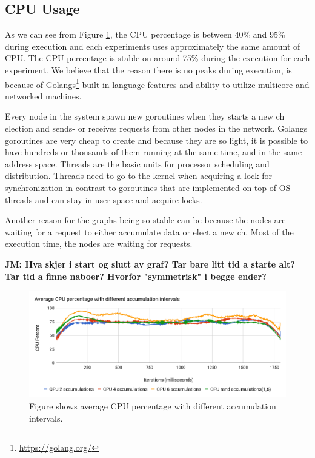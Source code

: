 \documentclass[USenglish]{uit-thesis}
\begin{document}
\subsection{CPU Usage}
As we can see from Figure \ref{fig:cpuChart}, the CPU percentage is between 40\% and 95\% during execution and each experiments uses approximately the same amount of CPU.
The CPU percentage is stable on around 75\% during the execution for each experiment. We believe that the reason there is no peaks during execution, is because of Golangs\footnote{\url{https://golang.org/}} built-in language features and ability to utilize multicore and networked machines.

Every node in the system spawn new goroutines when they starts a new \gls{ch} election and sends- or receives requests from other nodes in the network.
Golangs goroutines are very cheap to create and because they are so light, it is possible to have hundreds or thousands of them running at the same time, and in the same address space. Threads are the basic units for processor scheduling and distribution. Threads need to go to the kernel when acquiring a lock for synchronization in contrast to goroutines that are implemented on-top of OS threads and can stay in user space and acquire locks.

Another reason for the graphs being so stable can be because the nodes are waiting for a request to either accumulate data or elect a new \gls{ch}. Most of the execution time, the nodes are waiting for requests.



\textbf{JM: Hva skjer i start og slutt av graf? Tar bare litt tid a starte alt? Tar tid a finne naboer? Hvorfor "symmetrisk" i begge ender?}

\begin{figure} [ht]
\centering
\includegraphics[width=\textwidth]{cpuChart.png}
\caption{Figure shows average CPU percentage with different accumulation intervals.}
\label{fig:cpuChart}
\end{figure}
\end{document}
